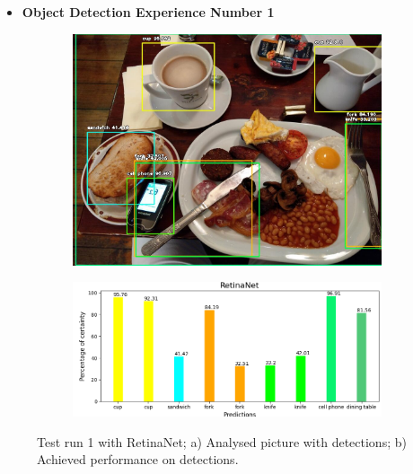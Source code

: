 \newpage
    
  \begin{itemize}
    \item \textbf{Object Detection Experience Number 1}
  \end{itemize}

    

      \begin{figure}[H]
        \centering
        \captionsetup{justification=centering}

        \begin{subfigure}{0.29\textwidth}
        \includegraphics[width=\textwidth]{Sections/4InitialWork/4_images_obj_run1/retinaNet.jpg} 
        \caption{}
        \end{subfigure}
        \begin{subfigure}{0.65\textwidth}
        \includegraphics[width=\textwidth]{Sections/4InitialWork/4_images_obj_run1/retinaNet_graph.png}
        \caption{}
      
        \end{subfigure}
        
        \caption[Test run 1 with RetinaNet]{ 
        Test run 1 with RetinaNet; a) Analysed picture with detections; b) Achieved performance on detections. }
        \label{fig:retina_1}
        \end{figure}
    

